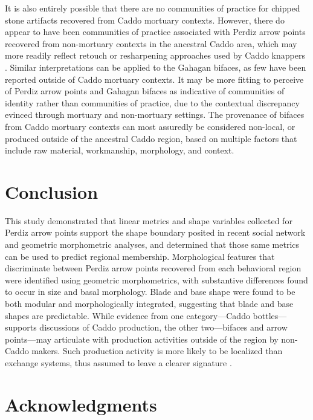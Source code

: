 \documentclass[smallextended]{svjour3}       %
\begin{document}
It is also entirely possible that there are no communities of practice
for chipped stone artifacts recovered from Caddo mortuary contexts.
However, there do appear to have been communities of practice associated
with Perdiz arrow points recovered from non-mortuary contexts in the
ancestral Caddo area, which may more readily reflect retouch or
resharpening approaches used by Caddo knappers
\cite{RN9364,RN8486,RN11097}. Similar interpretations can be applied to
the Gahagan bifaces, as few have been reported outside of Caddo mortuary
contexts. It may be more fitting to perceive of Perdiz arrow points and
Gahagan bifaces as indicative of communities of identity rather than
communities of practice, due to the contextual discrepancy evinced
through mortuary and non-mortuary settings. The provenance of bifaces
from Caddo mortuary contexts can most assuredly be considered non-local,
or produced outside of the ancestral Caddo region, based on multiple
factors that include raw material, workmanship, morphology, and context.

\hypertarget{conclusion}{%
\section{Conclusion}\label{conclusion}}

This study demonstrated that linear metrics and shape variables
collected for Perdiz arrow points support the shape boundary posited in
recent social network and geometric morphometric analyses, and
determined that those same metrics can be used to predict regional
membership. Morphological features that discriminate between Perdiz
arrow points recovered from each behavioral region were identified using
geometric morphometrics, with substantive differences found to occur in
size and basal morphology. Blade and base shape were found to be both
modular and morphologically integrated, suggesting that blade and base
shapes are predictable. While evidence from one category---Caddo
bottles---supports discussions of Caddo production, the other
two---bifaces and arrow points---may articulate with production
activities outside of the region by non-Caddo makers. Such production
activity is more likely to be localized than exchange systems, thus
assumed to leave a clearer signature \cite{RN7019}.

\hypertarget{acknowledgments}{%
\section*{Acknowledgments}\label{acknowledgments}}
\end{document}
